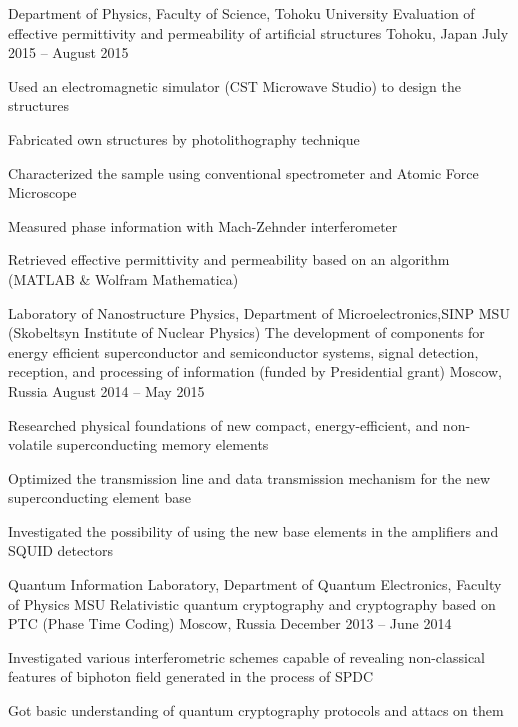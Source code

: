 \begin{cventries}
	\cventry
		{Department of Physics, Faculty of Science, Tohoku University}
		{Evaluation of effective permittivity and permeability of artificial structures}
		{Tohoku, Japan}
		{July 2015 -- August 2015}
		{
			\begin{cvitems}
				\item {Used an electromagnetic simulator (CST Microwave Studio) to design the structures}
				\item {Fabricated own structures by photolithography technique}
				\item {Characterized the sample using conventional spectrometer and Atomic Force Microscope}
				\item {Measured phase information with Mach-Zehnder interferometer}
				\item {Retrieved effective permittivity and permeability based on an algorithm (MATLAB \& Wolfram Mathematica)}
			\end{cvitems}
		}
		
	\cventry
		{Laboratory of Nanostructure Physics, Department of Microelectronics,\linebreak SINP MSU (Skobeltsyn Institute of Nuclear Physics)}
		{The development of components for energy efficient superconductor and semiconductor systems, signal detection, reception, and processing of information (funded by Presidential grant)}
		{Moscow, Russia}
		{August 2014 -- May 2015}
		{
			\begin{cvitems}
				\item {Researched physical foundations of new compact, energy-efficient, and non-volatile superconducting memory elements}
				\item {Optimized the transmission line and data transmission mechanism for the new superconducting element base}
				\item {Investigated the possibility of using the new base elements in the amplifiers and SQUID detectors}
			\end{cvitems}
		}

	
	\cventry
		{
			Quantum Information Laboratory, Department of Quantum Electronics, Faculty of Physics MSU
		}
		{
			Relativistic quantum cryptography and cryptography based on PTC (Phase Time Coding)
		}
		{Moscow, Russia}
		{December 2013 -- June 2014}
		{
			\begin{cvitems}
				\item {Investigated various interferometric schemes capable of revealing non-classical features of biphoton field generated in the process of SPDC}
				\item {Got basic understanding of quantum cryptography protocols and attacs on them}
			\end{cvitems}
		}
		

\end{cventries}
